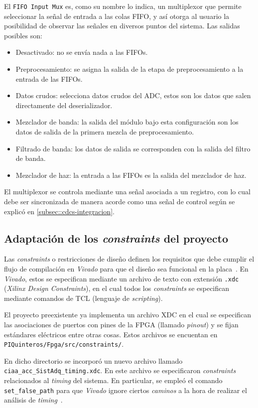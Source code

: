 \documentclass[../../main.tex]{subfiles}
\begin{document}
El \texttt{FIFO Input Mux} es, como su nombre lo indica, un multiplexor que permite seleccionar la señal de entrada a las colas FIFO, y así otorga al usuario la posibilidad de observar las señales en diversos puntos del sistema. Las salidas posibles son:
\begin{itemize}
    \item Desactivado: no se envía nada a las FIFOs.
    \item Preprocesamiento: se asigna la salida de la etapa de preprocesamiento a la entrada de las FIFOs.
    \item Datos crudos: selecciona datos crudos del ADC, estos son los datos que salen directamente del deserializador.
    \item Mezclador de banda: la salida del módulo bajo esta configuración son los datos de salida de la primera mezcla de preprocesamiento.
    \item Filtrado de banda: los datos de salida se corresponden con la salida del filtro de banda.
    \item Mezclador de haz: la entrada a las FIFOs es la salida del mezclador de haz.
\end{itemize}
El multiplexor se controla mediante una señal asociada a un registro, con lo cual debe ser sincronizada de manera acorde como una señal de control según se explicó en \ref{subsec::cdcs-integracion}.

\subsection{Adaptación de los \textit{constraints} del proyecto}
Las \textit{constraints} o restricciones de diseño definen los requisitos que debe cumplir el flujo de compilación en \textit{Vivado} para que el diseño sea funcional en la placa~\cite{xdc-constraints}. En \textit{Vivado}, estos se especifican mediante un archivo de texto con extensión \texttt{.xdc} (\textit{Xilinx Design Constraints}), en el cual todos los \textit{constraints} se especifican mediante comandos de TCL (lenguaje de \textit{scripting}).

El proyecto preexistente ya implementa un archivo XDC en el cual se especifican las asociaciones de puertos con pines de la FPGA (llamado \textit{pinout}) y se fijan estándares eléctricos entre otras cosas. Estos archivos se encuentan en \texttt{PIQuinteros/Fpga/src/constraints/}.

En dicho directorio se incorporó un nuevo archivo llamado \texttt{ciaa\_acc\_SistAdq\_timing.xdc}. En este archivo se especificaron \textit{constraints} relacionados al \textit{timing} del sistema. En particular, se empleó el comando \texttt{set\_false\_path} para que \textit{Vivado} ignore ciertos \textit{caminos} a la hora de realizar el análisis de \textit{timing}~\cite{false-paths}.
\end{document}
